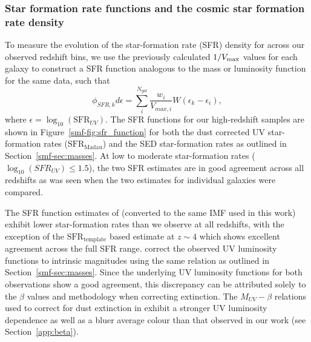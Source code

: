 \subsubsection{Star formation rate functions and the cosmic star formation rate density}
To measure the evolution of the star-formation rate (SFR) density for across our observed redshift bins, we use the previously calculated $1/V_{\rm{max}}$ values for each galaxy to construct a SFR function analogous to the mass or luminosity function for the same data, such that
\begin{equation}\label{eq:vmaxmethod_sfr}
\phi_{SFR,k}d\epsilon = \sum_{i}^{N_{gal}} \frac{w_{i}}{V_{max,i}}W(\epsilon_{k}-\epsilon_{i}),
\end{equation}
where $\epsilon = \log_{10}(\text{SFR}_{UV})$. The SFR functions for our high-redshift samples are shown in Figure~\ref{smf-fig:sfr_function} for both the dust corrected UV star-formation rates ($\text{SFR}_{\text{Madau}}$) and the SED star-formation rates as outlined in Section~\ref{smf-sec:masses}. At low to moderate star-formation rates ($\log_{10}(SFR_{UV}) \leq 1.5$), the two SFR estimates are in good agreement across all redshifts as was seen when the two estimates for individual galaxies were compared. 

The SFR function estimates of \citet{Smit:2012is} (converted to the same IMF used in this work) exhibit lower star-formation rates than we observe at all redshifts, with the exception of the $\text{SFR}_{\text{template}}$ based estimate at $z\sim4$ which shows excellent agreement across the full SFR range. \citet{Smit:2012is} correct the observed UV luminosity functions \citep{2007ApJ...670..928B,Anonymous:96uKWdy6} to intrinsic magnitudes using the same \citet{Meurer:1999jm} relation as outlined in Section~\ref{smf-sec:masses}. Since the underlying UV luminosity functions for both observations show a good agreement, this discrepancy can be attributed solely to the $\beta$ values and methodology when correcting extinction. The \citet{2012ApJ...754...83B} $M_{UV}-\beta$ relations used to correct for dust extinction in \citet{Smit:2012is} exhibit a stronger UV luminosity dependence as well as a bluer average colour than that observed in our work (see Section~\ref{app:beta}). 

